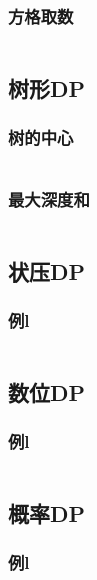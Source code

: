\documentclass[a4paper,11pt]{article}
\begin{document}
\subsubsection{方格取数} %
\inputminted[breaklines]{c++}{dp/线性dp/matrix.cpp}

\newpage %
\subsection{树形DP} %

\subsubsection{树的中心} %
\inputminted[breaklines]{c++}{dp/树形/center.cpp}
\newpage %
\subsubsection{最大深度和} %
\inputminted[breaklines]{c++}{dp/树形/maxdepth.cpp}

\newpage %
\subsection{状压DP} %

\subsubsection{例l} %
\inputminted[breaklines]{c++}{dp/状压/1.cpp}

\newpage %
\subsection{数位DP} %

\subsubsection{例l} %
\inputminted[breaklines]{c++}{dp/数位/windy.cpp}

\newpage %
\subsection{概率DP} %

\subsubsection{例l} %
\inputminted[breaklines]{c++}{dp/概率dp/1.cpp}
\end{document}
